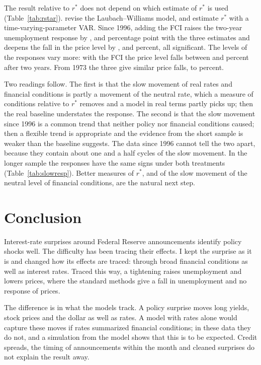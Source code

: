 \documentclass[11pt]{article}
\newcommand{\rs}{r^{*}}
\begin{document}
The result relative to $\rs$ does not depend on which estimate of $\rs$ is used (Table~\ref{tab:rstar}). \citet{holston2023} revise the Laubach--Williams model, and \citet{lubik2015} estimate $\rs$ with a time-varying-parameter VAR. Since 1996, adding the FCI raises the two-year unemployment response by ,  and  percentage point with the three estimates and deepens the fall in the price level by ,  and  percent, all significant. The levels of the responses vary more: with the FCI the price level falls between  and  percent after two years. From 1973 the three give similar price falls,  to  percent.



Two readings follow. The first is that the slow movement of real rates and financial conditions is partly a movement of the neutral rate, which a measure of conditions relative to $\rs$ removes and a model in real terms partly picks up; then the real baseline understates the response. The second is that the slow movement since 1996 is a common trend that neither policy nor financial conditions caused; then a flexible trend is appropriate and the evidence from the short sample is weaker than the baseline suggests. The data since 1996 cannot tell the two apart, because they contain about one and a half cycles of the slow movement. In the longer sample the responses have the same signs under both treatments (Table~\ref{tab:slowresp}). Better measures of $\rs$, and of the slow movement of the neutral level of financial conditions, are the natural next step.

\FloatBarrier
\section{Conclusion}\label{sec:policy}
Interest-rate surprises around Federal Reserve announcements identify policy shocks well. The difficulty has been tracing their effects. I kept the surprise as it is and changed how its effects are traced: through broad financial conditions as well as interest rates. Traced this way, a tightening raises unemployment and lowers prices, where the standard methods give a fall in unemployment and no response of prices.

The difference is in what the models track. A policy surprise moves long yields, stock prices and the dollar as well as rates. A model with rates alone would capture these moves if rates summarized financial conditions; in these data they do not, and a simulation from the model shows that this is to be expected. Credit spreads, the timing of announcements within the month and cleaned surprises do not explain the result away.
\end{document}
